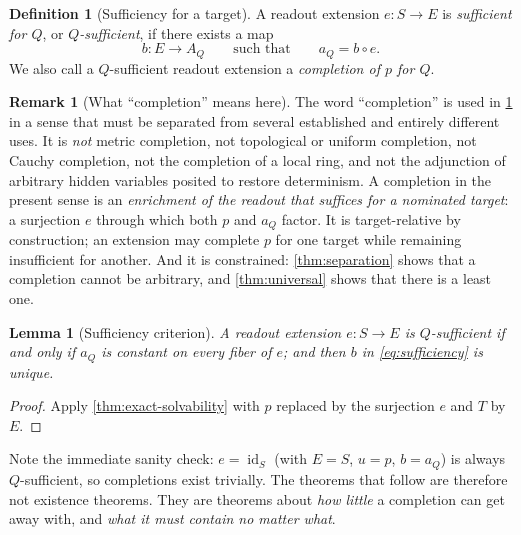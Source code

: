 \documentclass[11pt,reqno]{amsart}
\theoremstyle{plain}
\newtheorem{lemma}[theorem]{Lemma}
\theoremstyle{definition}
\newtheorem{definition}[theorem]{Definition}
\newtheorem{remark}[theorem]{Remark}
\newcommand{\Src}{S}
\newcommand{\Rdt}{T}
\newcommand{\id}{\operatorname{id}}
\begin{document}
\begin{definition}[Sufficiency for a target]\label{def:sufficient}
A readout extension $e\colon\Src\to E$ is \emph{sufficient for $Q$}, or \emph{$Q$-sufficient}, if
there exists a map
\begin{equation}\label{eq:sufficiency}
b\colon E\longrightarrow A_Q
\qquad\text{such that}\qquad
a_Q=b\circ e .
\end{equation}
We also call a $Q$-sufficient readout extension a \emph{completion of $p$ for $Q$}.
\end{definition}

\begin{remark}[What ``completion'' means here]\label{rem:completion-meaning}
The word ``completion'' is used in \cref{def:sufficient} in a sense that must be separated from
several established and entirely different uses. It is \emph{not} metric completion, not
topological or uniform completion, not Cauchy completion, not the completion of a local ring, and
not the adjunction of arbitrary hidden variables posited to restore determinism. A completion in
the present sense is an \emph{enrichment of the readout that suffices for a nominated target}: a
surjection $e$ through which both $p$ and $a_Q$ factor. It is target-relative by construction; an
extension may complete $p$ for one target while remaining insufficient for another. And it is
constrained: \cref{thm:separation} shows that a completion cannot be arbitrary, and
\cref{thm:universal} shows that there is a least one.
\end{remark}

\begin{lemma}[Sufficiency criterion]\label{lem:sufficiency-criterion}
A readout extension $e\colon\Src\to E$ is $Q$-sufficient if and only if $a_Q$ is constant on
every fiber of $e$; and then $b$ in \eqref{eq:sufficiency} is unique.
\end{lemma}

\begin{proof}
Apply \cref{thm:exact-solvability} with $p$ replaced by the surjection $e$ and $\Rdt$ by $E$.
\end{proof}

Note the immediate sanity check: $e=\id_\Src$ (with $E=\Src$, $u=p$, $b=a_Q$) is always
$Q$-sufficient, so completions exist trivially. The theorems that follow are therefore not
existence theorems. They are theorems about \emph{how little} a completion can get away with, and
\emph{what it must contain no matter what}.
\end{document}
